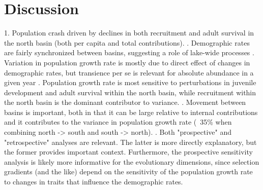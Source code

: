 

\section*{Discussion}

1. Population crash driven by declines in both recruitment and adult survival 
in the north basin (both per capita and total contributions).
\linebreak 
{}. Demographic rates are fairly synchronized between basins, 
suggesting a role of lake-wide processes
\linebreak
{}. Variation in population growth rate is mostly due to direct effect of changes 
in demographic rates, 
but transience per se is relevant for absolute abundance in a given year
\linebreak
{}. Population growth rate is most sensitive to perturbations in juvenile development
and adult survival within the north basin,
while recruitment within the north basin is the dominant contributor to variance.
\linebreak
{}. Movement between basins is important, 
both in that it can be large relative to internal contributions 
and it contributes to the variance in population growth rate 
(~35\% when combining north -> south and south -> north).
\linebreak
{}. Both "prospective" and "retrospective" analyses are relevant. 
The latter is more directly explanatory, 
but the former provides important context.
Furthermore, 
the prospective sensitivity analysis is likely more informative for the evolutionary 
dimensions, 
since selection gradients (and the like) depend 
on the sensitivity of the population growth rate
to changes in traits that influence the demographic rates.

